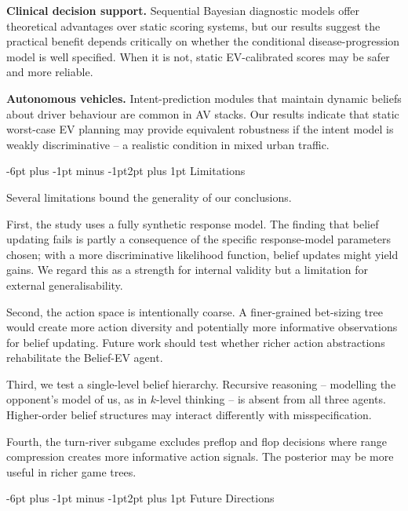 \documentclass[12pt]{article}
\makeatletter
\renewcommand\subsection{\@startsection{subsection}{2}{\z@}%
  {-6pt plus -1pt minus -1pt}{2pt plus 1pt}%
  {\normalfont\normalsize\bfseries}}
\makeatother
\begin{document}
\textbf{Clinical decision support.}
Sequential Bayesian diagnostic models offer theoretical advantages
over static scoring systems\cite{obermeyer2016predicting},
but our results suggest the practical benefit depends critically
on whether the conditional disease-progression model is well
specified.
When it is not, static EV-calibrated scores may be safer and
more reliable.

\textbf{Autonomous vehicles.}
Intent-prediction modules that maintain dynamic beliefs about
driver behaviour are common in AV stacks\cite{bard2020hanabi}.
Our results indicate that static worst-case EV planning may
provide equivalent robustness if the intent model is weakly
discriminative -- a realistic condition in mixed urban traffic.

\subsection{Limitations}

Several limitations bound the generality of our conclusions.

First, the study uses a fully synthetic response model.
The finding that belief updating fails is partly a consequence of
the specific response-model parameters chosen; with a more
discriminative likelihood function, belief updates might yield
gains.
We regard this as a strength for internal validity but a limitation
for external generalisability.

Second, the action space is intentionally coarse.
A finer-grained bet-sizing tree would create more action diversity
and potentially more informative observations for belief updating.
Future work should test whether richer action abstractions
rehabilitate the Belief-EV agent.

Third, we test a single-level belief hierarchy.
Recursive reasoning -- modelling the opponent's model of us,
as in $k$-level thinking\cite{osborne1994course} -- is absent
from all three agents.
Higher-order belief structures may interact differently with
misspecification.

Fourth, the turn-river subgame excludes preflop and flop
decisions where range compression creates more informative
action signals.
The posterior may be more useful in richer game trees.

\subsection{Future Directions}
\end{document}
